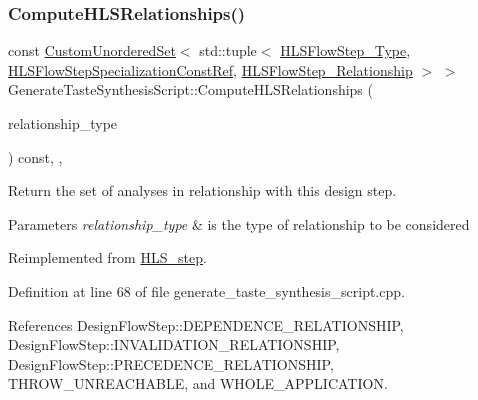 \subsubsection{\texorpdfstring{Compute\+H\+L\+S\+Relationships()}{ComputeHLSRelationships()}}
{\footnotesize\ttfamily const \hyperlink{classCustomUnorderedSet}{Custom\+Unordered\+Set}$<$ std\+::tuple$<$ \hyperlink{hls__step_8hpp_ada16bc22905016180e26fc7e39537f8d}{H\+L\+S\+Flow\+Step\+\_\+\+Type}, \hyperlink{hls__step_8hpp_a5fdd2edf290c196531d21d68e13f0e74}{H\+L\+S\+Flow\+Step\+Specialization\+Const\+Ref}, \hyperlink{hls__step_8hpp_a3ad360b9b11e6bf0683d5562a0ceb169}{H\+L\+S\+Flow\+Step\+\_\+\+Relationship} $>$ $>$ Generate\+Taste\+Synthesis\+Script\+::\+Compute\+H\+L\+S\+Relationships (\begin{DoxyParamCaption}\item[{const \hyperlink{classDesignFlowStep_a723a3baf19ff2ceb77bc13e099d0b1b7}{Design\+Flow\+Step\+::\+Relationship\+Type}}]{relationship\+\_\+type }\end{DoxyParamCaption}) const\hspace{0.3cm}{\ttfamily [override]}, {\ttfamily [protected]}, {\ttfamily [virtual]}}



Return the set of analyses in relationship with this design step. 


\begin{DoxyParams}{Parameters}
{\em relationship\+\_\+type} & is the type of relationship to be considered \\
\hline
\end{DoxyParams}


Reimplemented from \hyperlink{classHLS__step_aed0ce8cca9a1ef18e705fc1032ad4de5}{H\+L\+S\+\_\+step}.



Definition at line 68 of file generate\+\_\+taste\+\_\+synthesis\+\_\+script.\+cpp.



References Design\+Flow\+Step\+::\+D\+E\+P\+E\+N\+D\+E\+N\+C\+E\+\_\+\+R\+E\+L\+A\+T\+I\+O\+N\+S\+H\+IP, Design\+Flow\+Step\+::\+I\+N\+V\+A\+L\+I\+D\+A\+T\+I\+O\+N\+\_\+\+R\+E\+L\+A\+T\+I\+O\+N\+S\+H\+IP, Design\+Flow\+Step\+::\+P\+R\+E\+C\+E\+D\+E\+N\+C\+E\+\_\+\+R\+E\+L\+A\+T\+I\+O\+N\+S\+H\+IP, T\+H\+R\+O\+W\+\_\+\+U\+N\+R\+E\+A\+C\+H\+A\+B\+LE, and W\+H\+O\+L\+E\+\_\+\+A\+P\+P\+L\+I\+C\+A\+T\+I\+ON.

\mbox{\label{classGenerateTasteSynthesisScript_a1b01b440d4a3ea2e23b9753c83d7cf7d}} 
